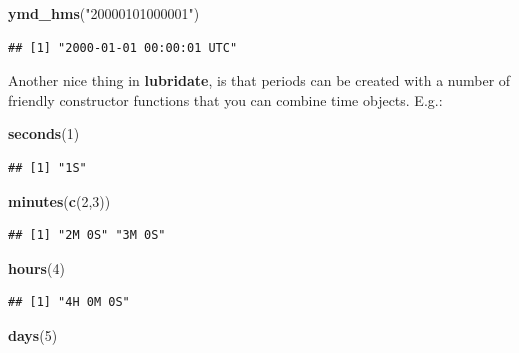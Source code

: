 \documentclass[]{book}
\newenvironment{Shaded}{\begin{snugshade}}{\end{snugshade}}
\newcommand{\DecValTok}[1]{\textcolor[rgb]{0.00,0.00,0.81}{#1}}
\newcommand{\KeywordTok}[1]{\textcolor[rgb]{0.13,0.29,0.53}{\textbf{#1}}}
\newcommand{\NormalTok}[1]{#1}
\newcommand{\StringTok}[1]{\textcolor[rgb]{0.31,0.60,0.02}{#1}}
\theoremstyle{definition}
\theoremstyle{definition}
\theoremstyle{definition}
\theoremstyle{remark}
\begin{document}
\begin{Shaded}
\begin{Highlighting}[]
\KeywordTok{ymd_hms}\NormalTok{(}\StringTok{"20000101000001"}\NormalTok{)}
\end{Highlighting}
\end{Shaded}

\begin{verbatim}
## [1] "2000-01-01 00:00:01 UTC"
\end{verbatim}

Another nice thing in \textbf{lubridate}, is that periods can be created with a number of friendly constructor functions that you can combine time objects. E.g.:

\begin{Shaded}
\begin{Highlighting}[]
\KeywordTok{seconds}\NormalTok{(}\DecValTok{1}\NormalTok{)}
\end{Highlighting}
\end{Shaded}

\begin{verbatim}
## [1] "1S"
\end{verbatim}

\begin{Shaded}
\begin{Highlighting}[]
\KeywordTok{minutes}\NormalTok{(}\KeywordTok{c}\NormalTok{(}\DecValTok{2}\NormalTok{,}\DecValTok{3}\NormalTok{))}
\end{Highlighting}
\end{Shaded}

\begin{verbatim}
## [1] "2M 0S" "3M 0S"
\end{verbatim}

\begin{Shaded}
\begin{Highlighting}[]
\KeywordTok{hours}\NormalTok{(}\DecValTok{4}\NormalTok{)}
\end{Highlighting}
\end{Shaded}

\begin{verbatim}
## [1] "4H 0M 0S"
\end{verbatim}

\begin{Shaded}
\begin{Highlighting}[]
\KeywordTok{days}\NormalTok{(}\DecValTok{5}\NormalTok{)}
\end{Highlighting}
\end{Shaded}
\end{document}
